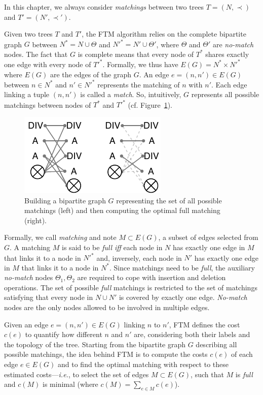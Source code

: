 In this chapter, we always consider \emph{matchings} between two trees $T=(N,\prec)$ and $T'=(N',\prec')$.

Given two trees $T$ and $T'$, the FTM algorithm relies on the complete bipartite graph $G$ between $N^* = N\cup{\Theta}$ and $N'^* = N'\cup{\Theta}'$, where $\Theta$ and $\Theta'$ are \textit{no-match} nodes.
The fact that $G$ is complete means that every node of $T^*$ shares exactly one edge with every node of $T'^*$.
Formally, we thus have $E(G) = N^* \times N'^*$ where $E(G)$ are the edges of the graph $G$.
An edge $e=(n, n') \in E(G)$ between $n\in N^*$ and $n'\in N'^*$ represents the matching of $n$ with $n'$. Each edge linking a tuple $(n, n')$ is called a \textit{match}.
So, intuitively, $G$ represents all possible matchings between nodes of $T^*$ and $T'^*$ (cf. Figure~\ref{sftm:fig:g_SFTM}).

\begin{figure}
    \centering 
    \includegraphics[width=.5\textwidth]{tree-matching/explanation/g_ftm}
    \caption{Building a bipartite graph $G$ representing the set of all possible matchings (left) and then computing the optimal full matching (right).}
    \label{sftm:fig:g_SFTM}%
\end{figure}

Formally, we call \textit{matching} and note $M\subset E(G)$, a subset of edges selected from $G$.
A matching $M$ is said to be \textit{full} \emph{iff} each node in $N$ has exactly one edge in $M$ that links it to a node in $N'^*$ and, inversely, each node in $N'$ has exactly one edge in $M$ that links it to a node in $N^*$.
Since matchings need to be \textit{full}, the auxiliary \textit{no-match} nodes $\Theta_1, \Theta_2$ are required to cope with insertion and deletion operations.
The set of possible \textit{full} matchings is restricted to the set of matchings satisfying that every node in $N \cup N'$ is covered by exactly one edge.
\emph{No-match} nodes are the only nodes allowed to be involved in multiple edges.

Given an edge $e=(n, n')\in E(G)$ linking $n$ to $n'$, FTM defines the cost $c(e)$ to quantify how different $n$ and $n'$ are, considering both their labels and the topology of the tree.
Starting from the bipartite graph $G$ describing all possible matchings, the idea behind FTM is to compute the costs $c(e)$ of each edge $e\in E(G)$ and to find the optimal matching with respect to these estimated costs---\emph{i.e.}, to select the set of edges $M\subset E(G)$, such that $M$ is \textit{full} and $c(M)$ is minimal (where $c(M) = \sum_{e\in M}c(e)$).

